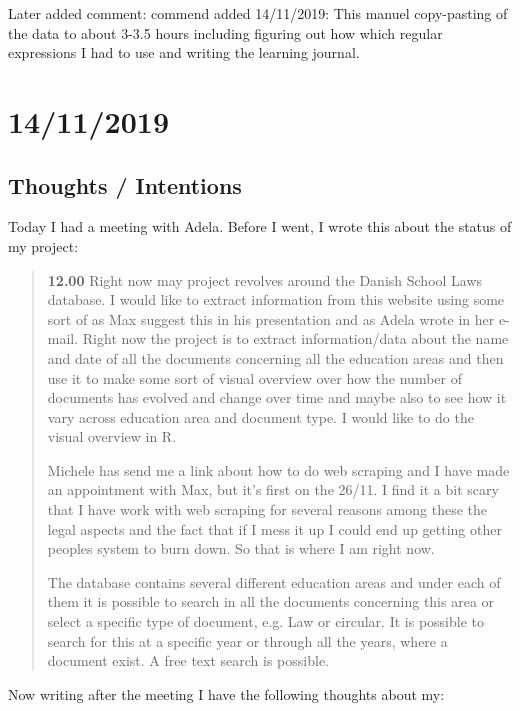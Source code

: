 \documentclass{article}
\begin{document}
Later added comment: commend added 14/11/2019: This manuel copy-pasting of the data to about 3-3.5 hours including figuring out how which regular expressions I had to use and writing the learning journal.
\pagebreak{}

\section{14/11/2019}
\subsection{Thoughts / Intentions}
Today I had a meeting with Adela. Before I went, I wrote this about the status of my project:
\begin{quote}
    \textbf{12.00} Right now may project revolves around the Danish School Laws database. I would like to extract information from this website using some sort of as Max suggest this in his presentation and as Adela wrote in her e-mail. Right now the project is to extract information/data about the name and date of all the documents concerning all the education areas and then use it to make some sort of visual overview over how the number of documents has evolved and change over time and maybe also to see how it vary across education area and document type. I would like to do the visual overview in R.
    
    Michele has send me a link about how to do web scraping and I have made an appointment with Max, but it's first on the 26/11. I find it a bit scary that I have work with web scraping for several reasons among these the legal aspects and the fact that if I mess it up I could end up getting other peoples system to burn down. So that is where I am right now.
    
    The database contains several different education areas and under each of them it is possible to search in all the documents concerning this area or select a specific type of document, e.g. Law or circular. It is possible to search for this at a specific year or through all the years, where a document exist. A free text search is possible. 
\end{quote}
Now writing after the meeting I have the following thoughts about my:
\end{document}
